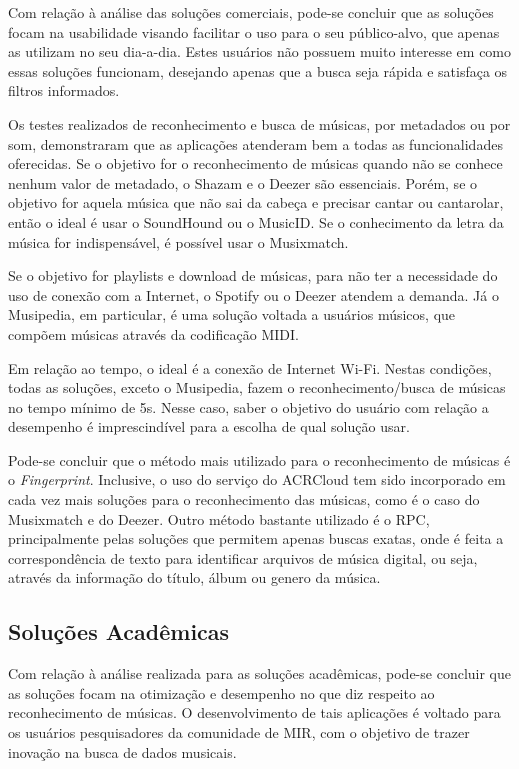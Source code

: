 Com relação à análise das soluções comerciais, pode-se concluir que as soluções focam na usabilidade visando facilitar o uso para o seu público-alvo, que apenas as utilizam no seu dia-a-dia. Estes usuários não possuem muito interesse em como essas soluções funcionam, desejando apenas que a busca seja rápida e satisfaça os filtros informados.

Os testes realizados de reconhecimento e busca de músicas, por metadados ou por som, demonstraram que as aplicações atenderam bem a todas as funcionalidades oferecidas. Se o objetivo for o reconhecimento de músicas quando não se conhece nenhum valor de metadado, o Shazam e o Deezer são essenciais. Porém, se o objetivo for aquela música que não sai da cabeça e precisar cantar ou cantarolar, então o ideal é usar o SoundHound ou o MusicID. Se o conhecimento da letra da música for indispensável, é possível usar o Musixmatch.

Se o objetivo for playlists e download de músicas, para não ter a necessidade do uso de conexão com a Internet, o Spotify ou o Deezer atendem a demanda. Já o Musipedia, em particular, é uma solução voltada a usuários músicos, que compõem músicas através da codificação MIDI.

Em relação ao tempo, o ideal é a conexão de Internet Wi-Fi. Nestas condições, todas as soluções, exceto o Musipedia, fazem o reconhecimento/busca de músicas no tempo mínimo de 5s. Nesse caso, saber o objetivo do usuário com relação a desempenho é imprescindível para a escolha de qual solução usar.

Pode-se concluir que o método mais utilizado para o reconhecimento de músicas é o \textit{Fingerprint}. Inclusive, o uso do serviço do ACRCloud tem sido incorporado em cada vez mais soluções para o reconhecimento das músicas, como é o caso do Musixmatch e do Deezer. Outro método bastante utilizado é o RPC, principalmente pelas soluções que permitem apenas buscas exatas, onde é feita a correspondência de texto para identificar arquivos de música digital, ou seja, através da informação do título, álbum ou genero da música.


\subsection{Soluções Acadêmicas}

Com relação à análise realizada para as soluções acadêmicas, pode-se concluir que as soluções focam na otimização e desempenho no que diz respeito ao reconhecimento de músicas. O desenvolvimento de tais aplicações é voltado para os usuários pesquisadores da comunidade de MIR, com o objetivo de trazer inovação na busca de dados musicais.

